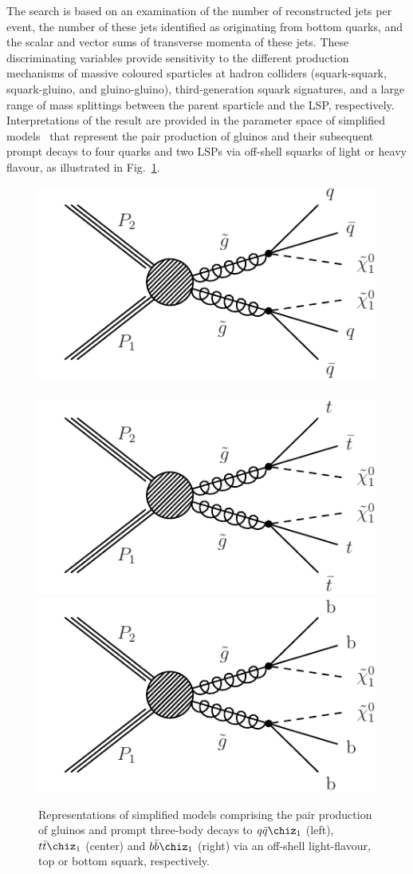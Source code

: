 The search is based on an examination of the number of reconstructed
jets per event, the number of these jets identified as originating
from bottom quarks, and the scalar and vector sums of transverse
momenta of these jets. 
These discriminating variables provide sensitivity to the different
production mechanisms of massive coloured sparticles at hadron
colliders (\ie squark-squark, squark-gluino, and gluino-gluino),
third-generation squark signatures, and a large range of mass
splittings between the parent sparticle and the LSP,
respectively. Interpretations of the result are provided in the
parameter space of simplified models~\cite{Alwall:2008ag,
  Alwall:2008va, sms} that represent the pair production of gluinos
and their subsequent prompt decays to four quarks and two LSPs via
off-shell squarks of light or heavy flavour, as illustrated in
Fig.~\ref{fig:feyn}.

\begin{figure}[thb]
\centering
\includegraphics[width=0.32\linewidth]{figures/diagrams/T1qqqq_feyn.pdf} \,
\includegraphics[width=0.32\linewidth]{figures/diagrams/T1tttt.pdf}
\includegraphics[width=0.32\linewidth]{figures/diagrams/T1bbbb_feyn.pdf}
\caption{Representations of simplified models comprising the pair
  production of gluinos and prompt three-body decays to
  $q\bar{q}\chiz_{1}$ (left), $t\bar{t}\chiz_{1}$ (center) and $b\bar{b}\chiz_{1}$ (right) via an
  off-shell light-flavour, top or bottom squark, respectively.}
\label{fig:feyn}
\end{figure}


